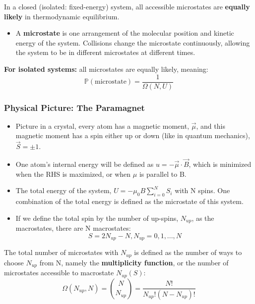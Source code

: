 \documentclass[12pt, letterpaper, twoside]{article}
\begin{document}
\begin{tcolorbox}[enhanced, boxrule = 0pt, frame hidden]
    In a closed (isolated: fixed-energy) system, all accessible microstates are \textbf{equally likely} in thermodynamic equilibrium.
\end{tcolorbox}
\begin{itemize}
    \item A \textbf{microstate} is one arrangement of the molecular position and kinetic energy of the system. Collisions change the microstate continuously, allowing the system to be in different microstates at different times.
\end{itemize}

\begin{tcolorbox}[enhanced, boxrule = 0pt, frame hidden]
    \textbf{For isolated systems:} all microstates are equally likely, meaning:
    \begin{equation}
        \mathbb{P}(\text{microstate}) = \frac{1}{\Omega(N, U)}
    \end{equation}
\end{tcolorbox}
\subsubsection{Physical Picture: The Paramagnet}

\begin{itemize}
    \item Picture in a crystal, every atom has a magnetic moment, $\vec{\mu}$, and this magnetic moment has a spin either up or down (like in quantum mechanics), $\vec{S} = \pm1$.
    \item One atom's internal energy will be defined as $u = -\vec{\mu}\cdot\vec{B}$, which is minimized when the RHS is maximized, or when $\mu$ is parallel to B.
    \item The total energy of the system, $U = -\mu_0B\sum_{i=0}^NS_i$ with N spins. One combination of the total energy is defined as the microstate of this system.
    \item If we define the total spin by the number of up-spins, $N_{up}$, as the macrostates, there are N macrostates:
    \begin{equation*}
        S = 2N_{up} - N, N_{up} = 0, 1, ..., N
    \end{equation*}
\end{itemize} 
\begin{tcolorbox}[enhanced, boxrule = 0pt, frame hidden]
    The total number of microstates with $N_{up}$ is defined as the number of ways to choose $N_{up}$ from N, namely the \textbf{multiplicity function}, or the number of microstates accessible to macrostate $N_{up}(S)$:
    \begin{equation}
        \Omega(N_{up}, N) = {N \choose N_{up}} = \frac{N!}{N_{up}!(N-N_{up})!}
    \end{equation}
\end{tcolorbox}
\end{document}
